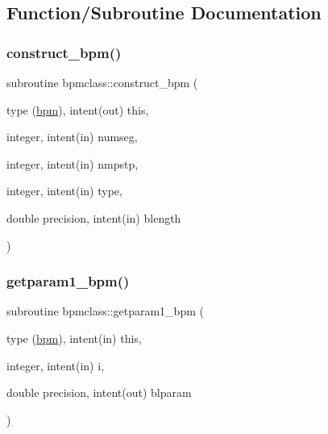 \subsection{Function/\+Subroutine Documentation}
\mbox{\label{namespacebpmclass_a777700e03d6422437747b159baf8ac47}} 
\subsubsection{\texorpdfstring{construct\_bpm()}{construct\_bpm()}}
{\footnotesize\ttfamily subroutine bpmclass\+::construct\+\_\+bpm (\begin{DoxyParamCaption}\item[{type (\mbox{\hyperlink{namespacebpmclass_structbpmclass_1_1bpm}{bpm}}), intent(out)}]{this,  }\item[{integer, intent(in)}]{numseg,  }\item[{integer, intent(in)}]{nmpstp,  }\item[{integer, intent(in)}]{type,  }\item[{double precision, intent(in)}]{blength }\end{DoxyParamCaption})}

\mbox{\label{namespacebpmclass_ac5588f058f6a85c7c6c131ca7172065d}} 
\subsubsection{\texorpdfstring{getparam1\_bpm()}{getparam1\_bpm()}}
{\footnotesize\ttfamily subroutine bpmclass\+::getparam1\+\_\+bpm (\begin{DoxyParamCaption}\item[{type (\mbox{\hyperlink{namespacebpmclass_structbpmclass_1_1bpm}{bpm}}), intent(in)}]{this,  }\item[{integer, intent(in)}]{i,  }\item[{double precision, intent(out)}]{blparam }\end{DoxyParamCaption})}

\mbox{\label{namespacebpmclass_ae88ec9feb4f283a3914a0859b14dc8dc}} 

